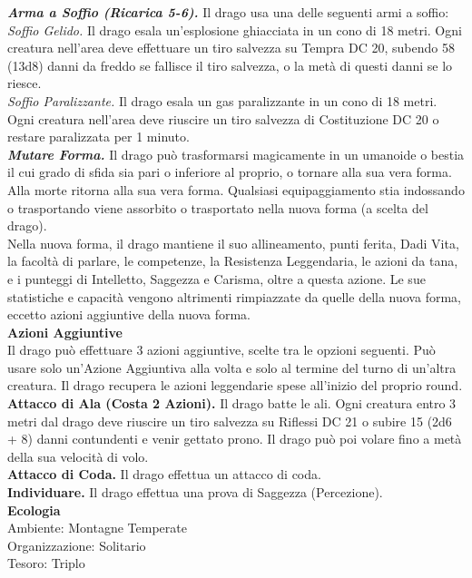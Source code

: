 \begin{multicols}{2}
\emph{\textbf{Arma a Soffio (Ricarica 5-6).}} Il drago usa una delle seguenti armi a soffio:\\
\emph{Soffio Gelido.} Il drago esala un'esplosione ghiacciata in un cono di 18 metri. Ogni creatura nell'area deve effettuare un tiro salvezza su Tempra DC 20, subendo 58 (13d8) danni da freddo se fallisce il tiro salvezza, o la metà di questi danni se lo riesce.\\
\emph{Soffio Paralizzante.} Il drago esala un gas paralizzante in un cono di 18 metri. Ogni creatura nell'area deve riuscire un tiro salvezza di Costituzione DC 20 o restare paralizzata per 1 minuto.\\
\emph{\textbf{Mutare Forma.}} Il drago può trasformarsi magicamente in un umanoide o bestia il cui grado di sfida sia pari o inferiore al proprio, o tornare alla sua vera forma. Alla morte ritorna alla sua vera forma. Qualsiasi equipaggiamento stia indossando o trasportando viene assorbito o trasportato nella nuova forma (a scelta del drago).\\
Nella nuova forma, il drago mantiene il suo allineamento, punti ferita, Dadi Vita, la facoltà di parlare, le competenze, la Resistenza Leggendaria, le azioni da tana, e i punteggi di Intelletto, Saggezza e Carisma, oltre a questa azione. Le sue statistiche e capacità vengono altrimenti rimpiazzate da quelle della nuova forma, eccetto azioni aggiuntive della nuova forma.\\
\textbf{Azioni Aggiuntive}\\
Il drago può effettuare 3 azioni aggiuntive, scelte tra le opzioni seguenti. Può usare solo un'Azione Aggiuntiva alla volta e solo al termine del turno di un'altra creatura. Il drago recupera le azioni leggendarie spese all'inizio del proprio round.\\
\textbf{Attacco di Ala (Costa 2 Azioni).} Il drago batte le ali. Ogni creatura entro 3 metri dal drago deve riuscire un tiro salvezza su Riflessi DC 21 o subire 15 (2d6 + 8) danni contundenti e venir gettato prono. Il drago può poi volare fino a metà della sua velocità di volo.\\
\textbf{Attacco di Coda.} Il drago effettua un attacco di coda.\\
\textbf{Individuare.} Il drago effettua una prova di Saggezza (Percezione).\\
\textbf{Ecologia}\\
Ambiente: Montagne Temperate\\
Organizzazione: Solitario\\
Tesoro: Triplo\\

\end{multicols}
